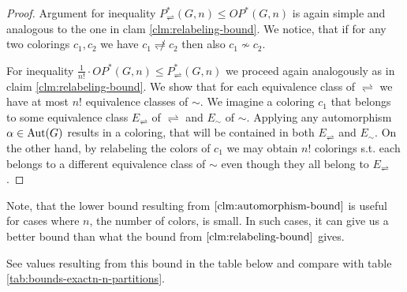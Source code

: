 \begin{highlight}
\begin{proof}

Argument for inequality $P^*_\rightleftharpoons(G,n) \leq OP^*(G,n)$ is again simple and analogous to the one in clam \ref{clm:relabeling-bound}. We notice, that if for any two colorings $c_1,c_2$ we have $c_1 \not\rightleftharpoons c_2$ then also $c_1 \not\sim c_2$.

For inequality $\frac{1}{n!} \cdot OP^*(G,n) \leq P^*_\rightleftharpoons(G,n)$ we proceed again analogously as in claim \ref{clm:relabeling-bound}. We show that for each equivalence class of $\rightleftharpoons$ we have at most $n!$ equivalence classes of $\sim$. We imagine a coloring $c_1$ that belongs to some equivalence class $E_\rightleftharpoons$ of $\rightleftharpoons$ and $E_\sim$ of $\sim$. Applying any automorphism $\alpha \in \operatorname{Aut}(G)$ results in a coloring, that will be contained in both $E_\rightleftharpoons$ and $E_\sim$. On the other hand, by relabeling the colors of $c_1$ we may obtain $n!$ colorings s.t. each belongs to a different equivalence class of $\sim$ even though they all belong to $E_\rightleftharpoons$.

\end{proof}

Note, that the lower bound resulting from $\ref{clm:automorphism-bound}$ is useful for cases where $n$, the number of colors, is small. In such cases, it can give us a better bound than what the bound from $\ref{clm:relabeling-bound}$ gives.

See values resulting from this bound in the table below and compare with table \ref{tab:bounds-exactn-n-partitions}.


\end{highlight}
